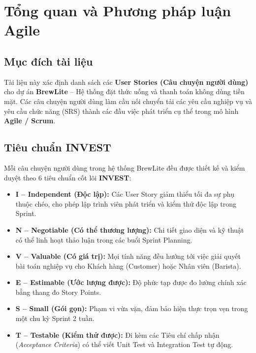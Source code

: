 \documentclass[12pt,a4paper]{article}
\begin{document}
\tableofcontents
\newpage

\section{Tổng quan và Phương pháp luận Agile}

\subsection{Mục đích tài liệu}
Tài liệu này xác định danh sách các \textbf{User Stories (Câu chuyện người dùng)} cho dự án \textbf{BrewLite} -- Hệ thống đặt thức uống và thanh toán không dùng tiền mặt. Các câu chuyện người dùng làm cầu nối chuyển tải các yêu cầu nghiệp vụ và yêu cầu chức năng (SRS) thành các đầu việc phát triển cụ thể trong mô hình \textbf{Agile / Scrum}.

\subsection{Tiêu chuẩn INVEST}
Mỗi câu chuyện người dùng trong hệ thống BrewLite đều được thiết kế và kiểm duyệt theo 6 tiêu chuẩn cốt lõi \textbf{INVEST}:
\begin{itemize}
    \item \textbf{I -- Independent (Độc lập):} Các User Story giảm thiểu tối đa sự phụ thuộc chéo, cho phép lập trình viên phát triển và kiểm thử độc lập trong Sprint.
    \item \textbf{N -- Negotiable (Có thể thương lượng):} Chi tiết giao diện và kỹ thuật có thể linh hoạt thảo luận trong các buổi Sprint Planning.
    \item \textbf{V -- Valuable (Có giá trị):} Mọi tính năng đều hướng tới việc giải quyết bài toán nghiệp vụ cho Khách hàng (Customer) hoặc Nhân viên (Barista).
    \item \textbf{E -- Estimable (Ước lượng được):} Độ phức tạp được đo lường chính xác bằng thang đo Story Points.
    \item \textbf{S -- Small (Gói gọn):} Phạm vi vừa vặn, đảm bảo hiện thực trọn vẹn trong một chu kỳ Sprint 2 tuần.
    \item \textbf{T -- Testable (Kiểm thử được):} Đi kèm các Tiêu chí chấp nhận (\textit{Acceptance Criteria}) có thể viết Unit Test và Integration Test tự động.
\end{itemize}
\end{document}
